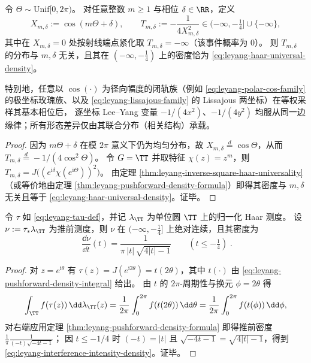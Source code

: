 \begin{corollary}\label{cor:leyang-cosine-energy-marginal-universality}
令 \(\Theta\sim\mathrm{Unif}[0,2\pi)\)。
对任意整数 \(m\ge 1\) 与相位 \(\delta\in\RR\)，定义
\[
X_{m,\delta}:=\cos(m\Theta+\delta),
\qquad
T_{m,\delta}:=-\frac{1}{4X_{m,\delta}^2}\in(-\infty,-\tfrac14]\cup\{-\infty\},
\]
其中在 \(X_{m,\delta}=0\) 处按射线端点紧化取 \(T_{m,\delta}=-\infty\)（该事件概率为 \(0\)）。
则 \(T_{m,\delta}\) 的分布与 \(m,\delta\) 无关，且其在 \((-\infty,-\tfrac14)\) 上的密度恰为 \eqref{eq:leyang-haar-universal-density}。
\par
特别地，任意以 \(\cos(\cdot)\) 为径向幅度的闭轨族（例如 \eqref{eq:leyang-polar-cos-family} 的极坐标玫瑰族、以及 \eqref{eq:leyang-lissajous-family} 的 Lissajous 两坐标）在等权采样其基本相位后，
逐坐标 Lee--Yang 变量 \(-1/(4x^2)\)、\(-1/(4y^2)\) 均服从同一边缘律；所有形态差异仅由其联合分布（相关结构）承载。
\end{corollary}
\begin{proof}
因为 \(m\Theta+\delta\) 在模 \(2\pi\) 意义下仍为均匀分布，故 \(X_{m,\delta}\stackrel{d}{=}\cos\Theta\)，从而 \(T_{m,\delta}\stackrel{d}{=}-1/(4\cos^2\Theta)\)。
令 \(G=\TT\) 并取特征 \(\chi(z)=z^m\)，则 \(T_{m,\delta}=J\bigl((e^{\mathrm{i}\delta}\chi(e^{\mathrm{i}\Theta}))^2\bigr)\)。
由定理 \ref{thm:leyang-inverse-square-haar-universality}（或等价地由定理 \ref{thm:leyang-pushforward-density-formula}）即得其密度与 \(m,\delta\) 无关且等于 \eqref{eq:leyang-haar-universal-density}。证毕。
\end{proof}

\begin{corollary}\label{cor:leyang-interference-intensity-density}
令 \(\tau\) 如 \eqref{eq:leyang-tau-def}，并记 \(\lambda_{\TT}\) 为单位圆 \(\TT\) 上的归一化 Haar 测度。
设 \(\nu:=\tau_{\ast}\lambda_{\TT}\) 为推前测度，则 \(\nu\) 在 \((-\infty,-\tfrac14]\) 上绝对连续，且其密度为
\begin{equation}\label{eq:leyang-interference-intensity-density}
\boxed{\;
\frac{\dd\nu}{\dd t}(t)=\frac{1}{\pi\,|t|\,\sqrt{4|t|-1}}\qquad(t\le -\tfrac14)\; }.
\end{equation}
\end{corollary}
\begin{proof}
对 \(z=e^{\mathrm{i}\theta}\) 有 \(\tau(z)=J(e^{\mathrm{i}2\theta})=t(2\theta)\)，其中 \(t(\cdot)\) 由 \eqref{eq:leyang-pushforward-density-integral} 给出。
由 \(t\) 的 \(2\pi\)-周期性与换元 \(\phi=2\theta\) 得
\[
\int_{\TT} f(\tau(z))\,\dd\lambda_{\TT}(z)
=\frac{1}{2\pi}\int_{0}^{2\pi} f(t(2\theta))\,\dd\theta
=\frac{1}{2\pi}\int_{0}^{2\pi} f(t(\phi))\,\dd\phi,
\]
对右端应用定理 \ref{thm:leyang-pushforward-density-formula} 即得推前密度
\(
\frac{1}{\pi}\frac{1}{(-t)\sqrt{-4t-1}}
\)；
因 \(t\le -1/4\) 时 \((-t)=|t|\) 且 \(\sqrt{-4t-1}=\sqrt{4|t|-1}\)，得到 \eqref{eq:leyang-interference-intensity-density}。证毕。
\end{proof}

